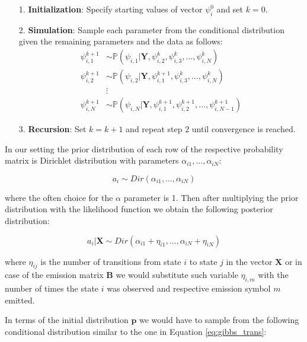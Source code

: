 \begin{itemize}
    \item[1.] \textbf{Initialization}: Specify starting values of vector $\psi_i^0$ and set $k=0$.
    \item[2.] \textbf{Simulation}: Sample each parameter from the conditional distribution given the remaining parameters and the data as follows:
    \begin{align*}
        \psi_{i,1}^{k+1} & \sim \mathbb{P}(\psi_{i,1}|\textbf{Y},\psi_{i,2}^k,\psi_{i,3}^k,\ldots,\psi_{i,N}^k) \\
        \psi_{i,2}^{k+1} & \sim \mathbb{P}(\psi_{i,2}|\textbf{Y},\psi_{i,1}^{k+1},\psi_{i,3}^k,\ldots,\psi_{i,N}^k) \\
        &\vdots\\
        \psi_{i,N}^{k+1} & \sim \mathbb{P}(\psi_{i,N}|\textbf{Y},\psi_{i,1}^{k+1},\psi_{i,2}^{k+1},\ldots,\psi_{i,N-1}^{k+1})
    \end{align*}
    
    \item[3.] \textbf{Recursion}: Set $k = k+1$ and repeat step 2 until convergence is reached.
\end{itemize}

In our setting the prior distribution of each row of the respective probability matrix is Dirichlet distribution with parameters $\alpha_{i1},\ldots,\alpha_{iN}$:

\begin{equation}
    a_i \sim Dir(\alpha_{i1},\ldots,\alpha_{iN})
\end{equation}

where the often choice for the $\alpha$ parameter is 1. Then after multiplying the prior distribution with the likelihood function 
we obtain the following posterior distribution:

\begin{equation} \label{eq:gibbs_trans}
    a_i|\textbf{X} \sim Dir(\alpha_{i1} + \eta_{i1},\ldots,\alpha_{iN} + \eta_{iN})
\end{equation}

where $\eta_{ij}$ is the number of transitions from state $i$ to state $j$ in the vector $\textbf{X}$ or in case of the emission matrix $\textbf{B}$ we would substitute such variable $\eta_{i,m}$ with 
the number of times the state $i$ was observed and respective emission symbol $m$ emitted. \citep{Rydén2008}

In terms of the initial distribution $\textbf{p}$ we would have to sample from the following conditional distribution similar to the one 
in Equation \ref{eq:gibbs_trans}:

